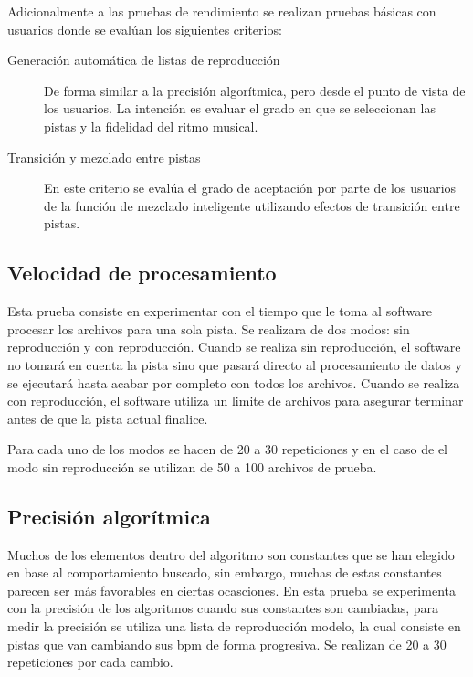 \noindent Adicionalmente a las pruebas de rendimiento se realizan pruebas b\'asicas con usuarios donde se eval\'uan los siguientes criterios:

\begin{description}
\item [Generaci\'on autom\'atica de listas de reproducci\'on]{De forma similar a la precisi\'on algor\'itmica, pero desde el punto de vista de los usuarios. La intenci\'on es evaluar el grado en que se seleccionan las pistas y la fidelidad del ritmo musical.}
\item [Transici\'on y mezclado entre pistas]{En este criterio se eval\'ua el grado de aceptaci\'on por parte de los usuarios de la funci\'on de mezclado inteligente utilizando efectos de transici\'on entre pistas.}
\end{description}

\subsection{Velocidad de procesamiento}

Esta prueba consiste en experimentar con el tiempo que le toma al software procesar los archivos para una sola pista. Se realizara de dos modos: sin reproducci\'on y con reproducci\'on. Cuando se realiza sin reproducci\'on, el software no tomar\'a en cuenta la pista sino que pasar\'a directo al procesamiento de datos y se ejecutar\'a hasta acabar por completo con todos los archivos. Cuando se realiza con reproducci\'on, el software utiliza un limite de archivos para asegurar terminar antes de que la pista actual finalice.

\noindent Para cada uno de los modos se hacen de 20 a 30 repeticiones y en el caso de el modo sin reproducci\'on se utilizan de 50 a 100 archivos de prueba.

\subsection{Precisi\'on algor\'itmica}

Muchos de los elementos dentro del algoritmo son constantes que se han elegido en base al comportamiento buscado, sin embargo, muchas de estas constantes parecen ser m\'as favorables en ciertas ocasciones. En esta prueba se experimenta con la precisi\'on de los algoritmos cuando sus constantes son cambiadas, para medir la precisi\'on se utiliza una lista de reproducci\'on modelo, la cual consiste en pistas que van cambiando sus bpm de forma progresiva. Se realizan de 20 a 30 repeticiones por cada cambio.

